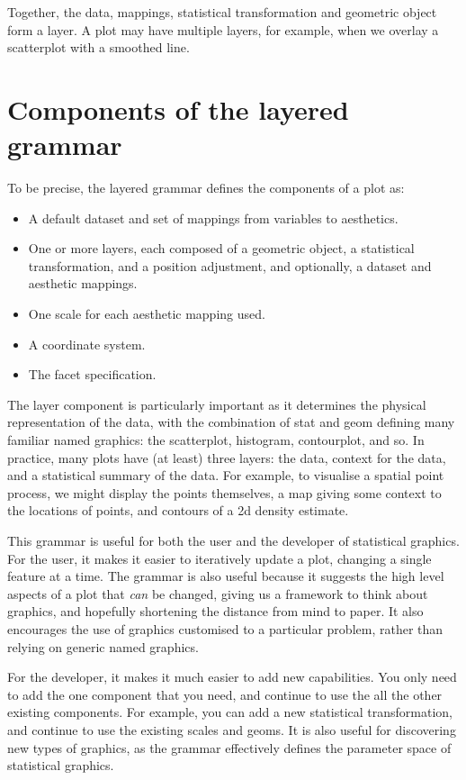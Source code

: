 \noindent Together, the data, mappings, statistical transformation and geometric object form a layer.  A plot may have multiple layers, for example, when we overlay a scatterplot with a smoothed line.

\section{Components of the layered grammar}

To be precise, the layered grammar defines the components of a plot as:

\begin{itemize}
  \item A default dataset and set of mappings from variables to aesthetics.
  \item One or more layers, each composed of a geometric object, a statistical transformation, and a position adjustment, and optionally, a dataset and aesthetic mappings.
  \item One scale for each aesthetic mapping used.
  \item A coordinate system.
  \item The facet specification.
\end{itemize}


The layer component is particularly important as it determines the physical representation of the data, with the combination of stat and geom defining many familiar named graphics: the scatterplot, histogram, contourplot, and so.  In practice, many plots have (at least) three layers: the data, context for the data, and a statistical summary of the data.  For example, to visualise a  spatial point process, we might display the points themselves, a map giving some context to the locations of points, and contours of a 2d density estimate.

This grammar is useful for both the user and the developer of statistical graphics.  For the user, it makes it easier to iteratively update a plot, changing a single feature at a time.  The grammar is also useful because it suggests the high level aspects of a plot that \emph{can} be changed, giving us a framework to think about graphics, and hopefully shortening the distance from mind to paper.  It also encourages the use of graphics customised to a particular problem, rather than relying on generic named graphics.

For the developer, it makes it much easier to add new capabilities. You only need to add the one component that you need, and continue to use the all the other existing components.  For example, you can add a new statistical transformation, and continue to use the existing scales and geoms.  It is also useful for discovering new types of graphics, as the grammar effectively defines the parameter space of statistical graphics.

